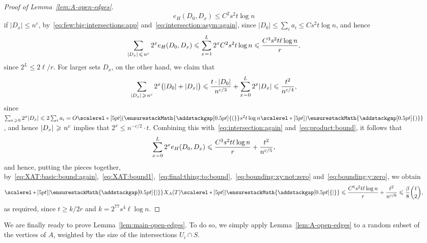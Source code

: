 \documentclass[12pt,reqno]{amsart}
\newcommand\pig[1]{\scalerel*[5pt]{\normalsize#1}{%
  \ensurestackMath{\addstackgap[0.5pt]{\normalsize#1}}}}
\theoremstyle{remark}
\numberwithin{theorem}{section}
\renewcommand{\(}{\bigl(}
\renewcommand{\)}{\bigr)\vphantom{)}}
\newcommand{\lea}{\hspace{0.03cm} \le \hspace{0.04cm}}
\newcommand{\gea}{\hspace{0.035cm} \ge \hspace{0.03cm}}
\newcommand{\eqa}{\hspace{0.02cm}=\hspace{0.015cm}}
\renewcommand{\le}{\leqslant}
\renewcommand{\ge}{\geqslant}
\begin{document}
\begin{proof}[Proof of Lemma~\ref{lem:A-open-edges}]
\begin{equation}\label{eq:intersection:asym:app}
e_H(D_0,D_x) \le C^2 s^2 t \log n
\end{equation}
if $|D_x| \le n^c$, by~\eqref{eq:few:big:intersections:app} and~\eqref{eq:intersection:asym:again}, since $|D_0| \le \sum_i a_i \le C s^2 t \log n$, and hence
$$\sum_{|D_x| \lea n^c} 2^{x} e_H(D_0, D_x) \le \sum_{x \eqa 1}^L 2^x C^2 s^2 t \log n \le \frac{C^3 s^2 t \ell \log n}{r},$$
since $2^L \le 2\ell/r$. For larger sets $D_x$, on the other hand, we claim that
$$
\sum_{|D_x| \gea n^c} 2^x \big( |D_0| + |D_x| \big) \le \frac{t \cdot |D_0|}{n^{c/3}} + \sum_{x \eqa 0}^L 2^x |D_x| \le \frac{t^2}{n^{c/4}},
$$
since $\sum_{x \gea 0} 2^x |D_x| \le 2 \sum_i a_i = O\pig( s^2 t \log n \pig)$, and hence $|D_x| \gea n^c$ implies that $2^x \le n^{-c/2} \cdot t$. Combining this with~\eqref{eq:intersection:again} and~\eqref{eq:product:bound}, it follows that
\begin{equation}\label{eq:bounding:y:zero}
\sum_{x \eqa 0}^L 2^{x} e_H(D_0, D_x) \le \frac{C^3 s^2 t \ell \log n}{r} + \frac{t^2}{n^{c/5}},
\end{equation}
and hence, putting the pieces together, by~\eqref{eq:XAT:basic:bound:again},~\eqref{eq:XAT:bound1},~\eqref{eq:final:thing:to:bound},~\eqref{eq:bounding:xy:not:zero} and~\eqref{eq:bounding:y:zero}, we obtain
\begin{equation}\label{eq:XAT:final:bound}
\pig| \hspace{0.015cm} X_A(T) \pig| \le \frac{C^6 s^2 t \ell \log n}{r} + \frac{t^2}{n^{c/6}} \le \frac{\beta}{8} {t \choose 2},
\end{equation}
as required, since $t \ge k/2r$ and $k = 2^{77} s^4 \ell \log n$. %
\end{proof}

\pagebreak

We are finally ready to prove Lemma~\ref{lem:main-open-edges}. To do so, we simply apply Lemma~\ref{lem:A-open-edges} to a random subset of the vertices of $A$, weighted by the size of the intersections $U_i \cap S$.
\end{document}
